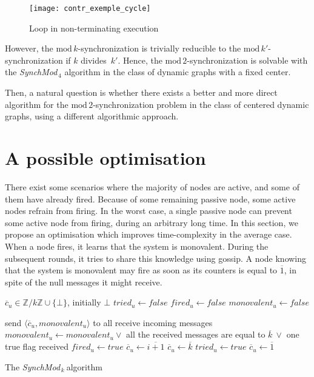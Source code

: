 \documentclass{article}
\newcommand{\SM}{{\em SynchMod}$_{\,k}\ $}
\begin{document}
\begin{figure}[h]
	\centering
	\texttt{[image: contr\_exemple\_cycle]}
	\caption{Loop in non-terminating execution}
\end{figure}

However,  the $\mathrm{mod}\,k$-synchronization is trivially reducible to the $\mathrm{mod}\,k'$-synchronization 
	if $k$ divides~$k'$.
Hence, the $\mathrm{mod}\,2$-synchronization is solvable with the {\em SynchMod}$_{\,4}$ algorithm 
	in the class of dynamic  graphs with a fixed center.

Then, a  natural question is  whether there exists a better and more direct algorithm for the $\mathrm{mod}\,2$-synchronization
problem in the class of  centered dynamic graphs, using a  different algorithmic approach. 

\section{A possible optimisation}

There exist some scenarios where the majority of nodes are active, and some of them have already fired. Because of some remaining passive node, some active nodes refrain from firing.
In the worst case, a single passive node can prevent some active node from firing, during an arbitrary long time.
In this section, we propose an optimisation which improves time-complexity in the average case.
When a node fires, it learns that the system is monovalent. During the subsequent rounds, it tries to share this knowledge using gossip.
A node knowing that the system is monovalent may fire as soon as its counters is equal to $\overline{1}$, in spite of the null messages it might receive.

\begin{algorithm}[htb]
\begin{distribalgo}[1]
\BLANK {}
	\STATE $\overline{c}_u \in \mathds{Z}/k\mathds{Z} \cup \{\bot\}$, initially $\bot$
	\STATE $tried_u \leftarrow false$
	\STATE $fired_u \leftarrow false$
	\STATE $monovalent_u \leftarrow false$

\ENDINDENT \BLANK

	\STATE send $\langle \overline{c}_u, monovalent_u \rangle$ to all 
	\STATE receive incoming messages
	\STATE $monovalent_u \leftarrow monovalent_u \vee$ all the received messages are equal to $\overline{k}~\vee$ one true flag received \label{line:detect-monovalent}
		\STATE $fired_u \leftarrow true$
	\ENDIF
		\STATE $\overline{c}_u \leftarrow \overline{i+1} $
	\ELSE {}
		\STATE $\overline{c}_u \leftarrow \overline{k} $
		\STATE $tried_u \leftarrow true$
	\ELSE
		\STATE $\overline{c}_u \leftarrow \overline{1}$
	\ENDIF
	\ENDIF
\ENDINDENT 

\caption{The \SM algorithm} 
\end{distribalgo}

\end{algorithm}
\end{document}
